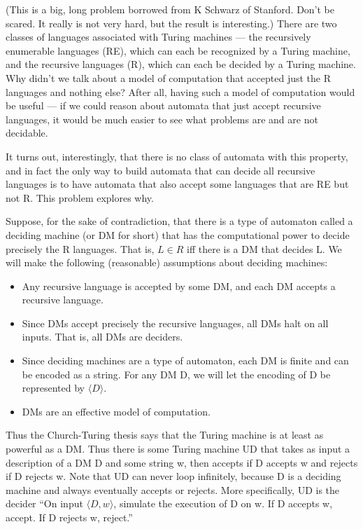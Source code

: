 

(This is a big, long problem borrowed from K Schwarz of Stanford. Don't be scared. It really is not very hard, but the result is interesting.) 
There are two classes of languages associated with Turing machines --- the recursively
enumerable languages (RE), which can each be recognized by a Turing machine, 
and the recursive languages (R), which can each be decided by a Turing machine.
Why didn't we talk about a model of computation that accepted just the R languages and nothing else? After all, having such a model of computation would be useful --- if we could reason about automata that just accept recursive languages, it would be much easier to see what problems are and are not decidable.

It turns out, interestingly, that there is no class of automata with this property, and in fact the only way to build automata that can decide all recursive languages is to have automata that also accept some languages that are RE but not R. This problem explores why.

Suppose, for the sake of contradiction, that there is a type of automaton called a deciding machine (or DM for short) that has the computational power to decide precisely the R languages. That is, $L \in R$ iff there is a DM that decides L.
We will make the following (reasonable) assumptions about deciding machines:
\begin{itemize}
\item Any recursive language is accepted by some DM, and each DM accepts a recursive language.
\item Since DMs accept precisely the recursive languages, all DMs halt on all inputs. That is, all DMs are deciders.
\item Since deciding machines are a type of automaton, each DM is finite and can be encoded as a string. For any DM D, we will let the encoding of D be represented by $\langle
D \rangle$.

\item DMs are an effective model of computation. 
\end{itemize}

Thus the Church-Turing thesis says that the Turing machine is at least as powerful as a DM. Thus there is some Turing machine UD that takes as input a description of a DM D and some string w, then accepts if D accepts w and rejects if D rejects w. Note that UD can never loop infinitely, because D is a deciding machine and always eventually accepts or rejects. More specifically, UD is the decider ``On input $\langle D, w \rangle$, 
simulate the execution of D on w. If D accepts w, accept. If D rejects w, reject.''

